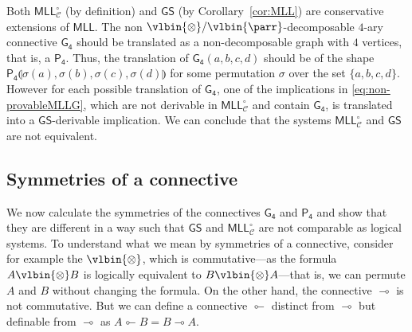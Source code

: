 \documentclass{lmcs} %
\def\limp{\multimap}
\def\lcoimp{\multimapinv}
\def\GS{\mathsf{GS}}
\newcommand{\connn}[1]{\llparenthesis#1\rrparenthesis}
\def\set#1{\{#1\}}
\def\cneg#1{{#1^\bot}}
\def\lpar{\vlbin{\parr}}
\def\ltens{\vlbin{\otimes}}
\def\MLL{\mathsf{MLL}}
\theoremstyle{plain}
\def\gcon{\mathsf{G_4}}
\def\Ccon{\mathsf C}
\def\pfour{\mathsf{P_4}}
\def\MLLgen{\MLL^\circ_{\mathcal C}}
\begin{document}
Both $\MLLgen$ (by definition) and $\GS$ (by Corollary~\ref{cor:MLL}) are {conservative} extensions of $\MLL$.
The non $\ltens/\lpar$-decomposable $4$-ary connective $\gcon$  should  be translated as a non-decomposable graph with $4$ vertices, that is, a $\pfour$.
Thus, the translation of $\gcon(a,b,c,d)$ should be of the shape $\pfour\connn{\sigma(a),\sigma(b),\sigma(c),\sigma(d)}$ for some permutation $\sigma$ over the set $\set{a,b,c,d}$.
However for each possible translation of $\gcon$, one of the  implications in  \eqref{eq:non-provableMLLG}, which are not derivable in $\MLLgen$ and contain $\gcon$,
is translated into a $\GS$-derivable implication.
We can conclude that the systems $\MLLgen$ and $\GS$ are not equivalent.


\subsection*{Symmetries of a connective}

\newcommand{\fourraryConGate}[5]{
\!\raisebox{-25pt}{	\begin{tikzpicture}[x=7, y=7,font=\scriptsize]
		\node (gateout) at (0,0) {};
		\node (out) at (0,-1) {};
		\node at (0,1) {$#5\strut$};
		\node (v2) at (-2.5,2) {};	
		\node (v3) at (2.5,2) {};
		\draw  (gateout.center) edge (out);
		\draw (gateout.center) -- (v2.center) -- (v3.center) -- (gateout.center);
		\node (gatein1) at (-1.5,2) {};
		\node (gatein2) at (-0.5,2) {};
		\node (gatein3) at (0.5,2) {};
		\node (gatein4) at (1.5,2) {};
		\node[inner sep=0] (in1) at (-1.5,4) {$a\strut$};
		\node[inner sep=0] (in2) at (-0.5,4) {$b\strut$};
		\node[inner sep=0] (in3) at (0.5,4) {$c\strut$};
		\node[inner sep=0] (in4) at (1.5,4) {$d\strut$};
		\draw  (in1) edge[looseness=1, in=90,out=-90] (gatein#1.center);
		\draw  (in2) edge[looseness=1, in=90,out=-90] (gatein#2.center);
		\draw  (in3) edge[looseness=1, in=90,out=-90] (gatein#3.center);
		\draw  (in4) edge[looseness=1, in=90,out=-90] (gatein#4.center);
	\end{tikzpicture}
}\!
}
\newcommand{\gcongate}[4]{\fourraryConGate{#1}{#2}{#3}{#4}{\gcon}}
\newcommand{\gcongatep}[4]{\fourraryConGate{#1}{#2}{#3}{#4}{\gcon'}}
\newcommand{\gcongates}[4]{\fourraryConGate{#1}{#2}{#3}{#4}{\gcon''}}
\newcommand{\Ccongate}[4]{\fourraryConGate{#1}{#2}{#3}{#4}{\Ccon}}
\newcommand{\nCcongate}[4]{\fourraryConGate{#1}{#2}{#3}{#4}{\cneg\Ccon}}

\def\symgroup{\mathfrak S}
\def\symgroupof#1{\symgroup(#1)}

We now calculate the symmetries of the connectives $\gcon$ and $\pfour$ and show that they are different in a way such that $\GS$ and $\MLLgen$ are not comparable as logical systems. To understand what we mean by symmetries of a connective, consider for example the $\ltens $, which is commutative---as the formula $A\ltens B$ is logically equivalent to $B\ltens A$---that is, we can permute $A$ and $B$ without changing the formula.
On the other hand, the connective $\limp$ is not commutative.
But we can define a connective $\lcoimp$ distinct from $\limp$ but definable from $\limp$ as $A\lcoimp B=B\limp A$.
\end{document}
